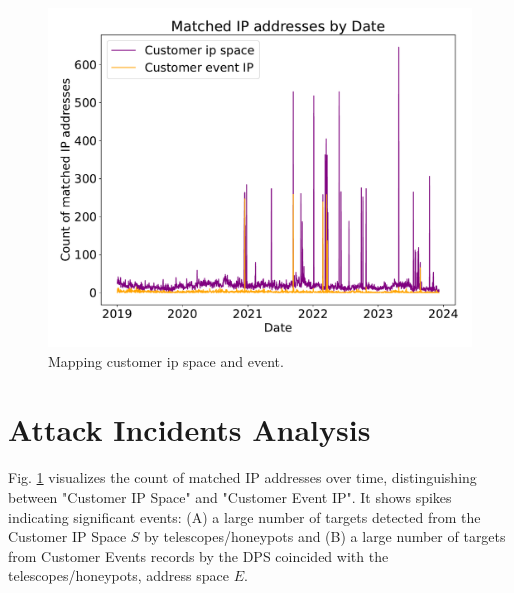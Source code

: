 \begin{figure}[htbp]
    \centering
    \includegraphics[scale=0.30]{graphs/matched_customer_graph.pdf}
    \caption{Mapping customer ip space and event.}
    \label{fig:mappedcustomergraph}
\end{figure}





\section{Attack Incidents Analysis}\label{sec:attackeventsfromcustomeripspace}
Fig. \ref{fig:mappedcustomergraph} visualizes the count of matched IP addresses over time, distinguishing between "Customer IP Space" and "Customer Event IP". It shows spikes indicating significant events: (A) a large number of targets detected from the Customer IP Space $S$ by telescopes/honeypots and (B) a large number of targets from Customer Events records by the DPS coincided with the telescopes/honeypots, address space $E$.

